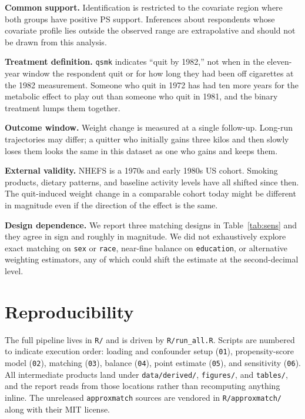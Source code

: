 \documentclass[11pt]{article}
\begin{document}
\textbf{Common support.}
Identification is restricted to the covariate region where both groups
have positive PS support. Inferences about respondents whose covariate
profile lies outside the observed range are extrapolative and should not
be drawn from this analysis.

\textbf{Treatment definition.}
\texttt{qsmk} indicates ``quit by 1982,'' not when in the eleven-year
window the respondent quit or for how long they had been off cigarettes
at the 1982 measurement. Someone who quit in 1972 has had ten more years
for the metabolic effect to play out than someone who quit in 1981, and
the binary treatment lumps them together.

\textbf{Outcome window.}
Weight change is measured at a single follow-up. Long-run trajectories
may differ; a quitter who initially gains three kilos and then slowly
loses them looks the same in this dataset as one who gains and keeps
them.

\textbf{External validity.}
NHEFS is a 1970s and early 1980s US cohort. Smoking products, dietary
patterns, and baseline activity levels have all shifted since then. The
quit-induced weight change in a comparable cohort today might be
different in magnitude even if the direction of the effect is the same.

\textbf{Design dependence.}
We report three matching designs in Table~\ref{tab:sens} and they agree
in sign and roughly in magnitude. We did not exhaustively explore exact
matching on \texttt{sex} or \texttt{race}, near-fine balance on
\texttt{education}, or alternative weighting estimators, any of which
could shift the estimate at the second-decimal level.

\section{Reproducibility}

The full pipeline lives in \texttt{R/} and is driven by
\texttt{R/run\_all.R}. Scripts are numbered to indicate execution order:
loading and confounder setup (\texttt{01}), propensity-score model
(\texttt{02}), matching (\texttt{03}), balance (\texttt{04}), point
estimate (\texttt{05}), and sensitivity (\texttt{06}). All intermediate
products land under \texttt{data/derived/}, \texttt{figures/}, and
\texttt{tables/}, and the report reads from those locations rather than
recomputing anything inline. The unreleased \texttt{approxmatch} sources are vendored in
\texttt{R/approxmatch/} along with their MIT license.
\end{document}

